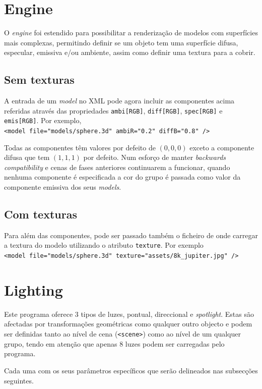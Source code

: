 \documentclass[a4paper]{article}
\begin{document}
\section{Engine}

O \textit{engine} foi estendido para possibilitar a renderização de
modelos com superfícies mais complexas, permitindo definir se um objeto tem uma
superfície difusa, especular, emissiva e/ou ambiente, assim como definir uma
textura para a cobrir.

\subsection{Sem texturas}
A entrada de um \textit{model} no XML pode agora incluir as componentes acima
referidas através das propriedades \texttt{ambi[RGB]}, \texttt{diff[RGB]},
\texttt{spec[RGB]} e \texttt{emis[RGB]}. Por exemplo,\\
\verb!<model file="models/sphere.3d" ambiR="0.2" diffB="0.8" />!

Todas as componentes têm valores por defeito de $(0,0,0)$ exceto a componente
difusa que tem $(1,1,1)$ por defeito. Num esforço de manter \textit{backwards
compatibility} e cenas de fases anteriores continuarem a funcionar, quando
nenhuma componente é especificada a cor do grupo é passada como valor da
componente emissiva dos seus \textit{models}.

\subsection{Com texturas}

Para além das componentes, pode ser passado também o ficheiro de onde carregar
a textura do modelo utilizando o atributo \texttt{texture}. Por exemplo\\
\verb!<model file="models/sphere.3d" texture="assets/8k_jupiter.jpg" />!

\section{Lighting}

Este programa oferece 3 tipos de luzes, pontual, direccional e
\textit{spotlight}. Estas são afectadas  por transformações geométricas como
qualquer outro objecto e podem ser definidas tanto ao nível de cena
(\texttt{<scene>}) como ao nível de um qualquer grupo, tendo em atenção que
apenas 8 luzes podem ser carregadas pelo programa.

Cada uma com os seus parâmetros específicos que serão delineados nas subsecções
seguintes.
\end{document}
